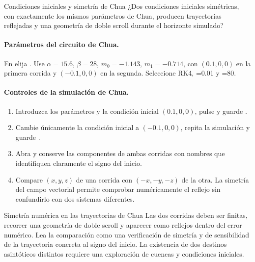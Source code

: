 \begin{cajaazul}{Condiciones iniciales y simetría de Chua}
¿Dos condiciones iniciales simétricas, con exactamente los mismos parámetros de
Chua, producen trayectorias reflejadas y una geometría de doble scroll durante
el horizonte simulado?
\end{cajaazul}

\paragraph{Parámetros del circuito de Chua.}
En  elija . Use
\(\alpha=15.6\), \(\beta=28\), \(m_0=-1.143\), \(m_1=-0.714\), con
\((0.1,0,0)\) en la primera corrida y \((-0.1,0,0)\) en la segunda.
Seleccione RK4, =0.01 y =80.

\paragraph{Controles de la simulación de Chua.}
\begin{enumerate}
  \item Introduzca los parámetros y la condición inicial \((0.1,0,0)\), pulse
   y guarde .
  \item Cambie únicamente la condición inicial a \((-0.1,0,0)\), repita la
  simulación y guarde .
  \item Abra  y conserve las componentes de ambas
  corridas con nombres que identifiquen claramente el signo del inicio.
  \item Compare \((x,y,z)\) de una corrida con \((-x,-y,-z)\) de la otra. La
  simetría del campo vectorial permite comprobar numéricamente el reflejo sin
  confundirlo con dos sistemas diferentes.
\end{enumerate}

\begin{cajaverde}{Simetría numérica en las trayectorias de Chua}
Las dos corridas deben ser finitas, recorrer una geometría de doble scroll y
aparecer como reflejos dentro del error numérico. Lea la comparación como una
verificación de simetría y de sensibilidad de la trayectoria concreta al signo
del inicio. La existencia de dos destinos asintóticos distintos requiere una
exploración de cuencas y condiciones iniciales.
\end{cajaverde}


